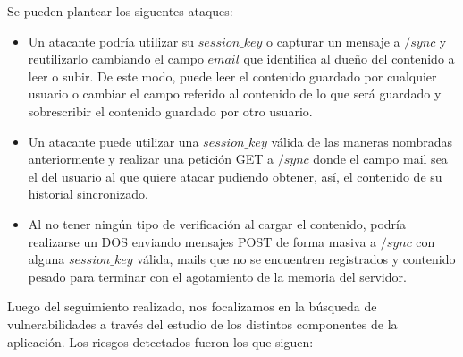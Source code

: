 \documentclass[10pt, a4paper]{article}
\begin{document}
Se pueden plantear los siguentes ataques:
\begin{shaded}
\begin{itemize}
\item Un atacante podría utilizar su $session\_key$ o capturar un mensaje a $/sync$ y reutilizarlo cambiando el campo $email$ que identifica al dueño del contenido a leer o subir. De este modo, puede leer el contenido guardado por cualquier usuario o cambiar el campo referido al contenido de lo que será guardado y sobrescribir el contenido guardado por otro usuario.
\item Un atacante puede utilizar una $session\_key$ válida de las maneras nombradas anteriormente y realizar una petición GET a $/sync$ donde el campo mail sea el del usuario al que quiere atacar pudiendo obtener, así, el contenido de su historial sincronizado.
\item Al no tener ningún tipo de verificación al cargar el contenido, podría realizarse un DOS enviando mensajes POST de forma masiva a $/sync$ con alguna $session\_key$ válida, mails que no se encuentren registrados y contenido pesado para terminar con el agotamiento de la memoria del servidor.
\end{itemize}
\end{shaded}

\newpage


Luego del seguimiento realizado, nos focalizamos en la búsqueda de vulnerabilidades a través del estudio de los distintos componentes de la aplicación. Los riesgos detectados fueron los que siguen:
\end{document}
